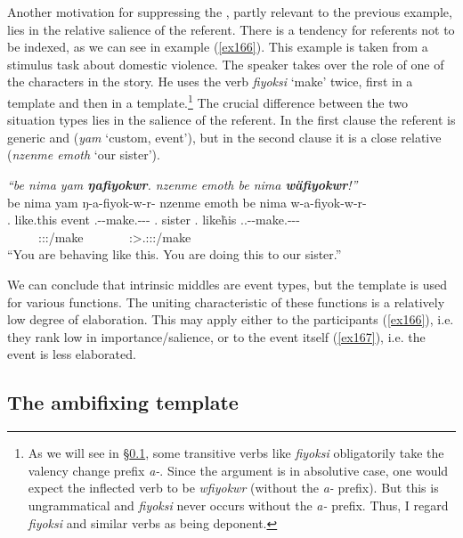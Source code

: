 Another motivation for suppressing the , partly relevant to the previous example, lies in the relative salience of the referent. There is a tendency for  referents not to be indexed, as we can see in example (\ref{ex166}). This example is taken from a stimulus task about domestic violence. The speaker takes over the role of one of the characters in the story. He uses the verb \emph{fiyoksi} `make' twice, first in a  template and then in a  template.\footnote{As we will see in \S{}\ref{ambifixingtemp}, some transitive verbs like \emph{fiyoksi} obligatorily take the valency change prefix \emph{a-}. Since the argument is in absolutive case, one would expect the inflected verb to be \emph{wfiyokwr} (without the \emph{a-} prefix). But this is ungrammatical and \emph{fiyoksi} never occurs without the \emph{a-} prefix. Thus, I regard \emph{fiyoksi} and similar verbs as being deponent.} The crucial difference between the two situation types lies in the salience of the referent. In the first clause the referent is generic and  (\emph{yam} `custom, event'), but in the second clause it is a close relative (\emph{nzenme emoth} `our sister').

\begin{exe}
	\ex \emph{``be nima yam \textbf{ŋafiyokwr}. nzenme emoth be nima \textbf{wäfiyokwr}!''}\\
	\glll be nima yam ŋ-a-fiyok-w-r-\Zero{} nzenme emoth be nima w-a-fiyok-w-r-\Zero{}\\
	\Ssg.\Erg{} like.this event \M.\Alph-\Vc-make.\Ext-\Ndu-\Lk-\Stsg{} \Fnsg.\Poss{} sister \Ssg.\Erg{} like\.his \Tsg.\F.\Alph-\Vc-make.\Ext-\Ndu-\Lk-\Stsg\\
	~ ~ ~ {\Stsg:\Sbj:\Nonpast:\Ipfv/make} ~ ~ ~ ~ {\Stsg:\Sbj>\Tsg.\F:\Obj:\Nonpast:\Ipfv/make}\\
	\trans ``You are behaving like this. You are doing this to our sister.''\\ 
	\label{ex166}
\end{exe}

We can conclude that intrinsic middles are  event types, but the  template is used for various functions. The uniting characteristic of these functions is a relatively low degree of elaboration. This may apply either to the participants (\ref{ex166}), i.e. they rank low in importance/salience, or to the event itself (\ref{ex167}), i.e. the event is less elaborated.

\subsection{The ambifixing template} \label{ambifixingtemp}

